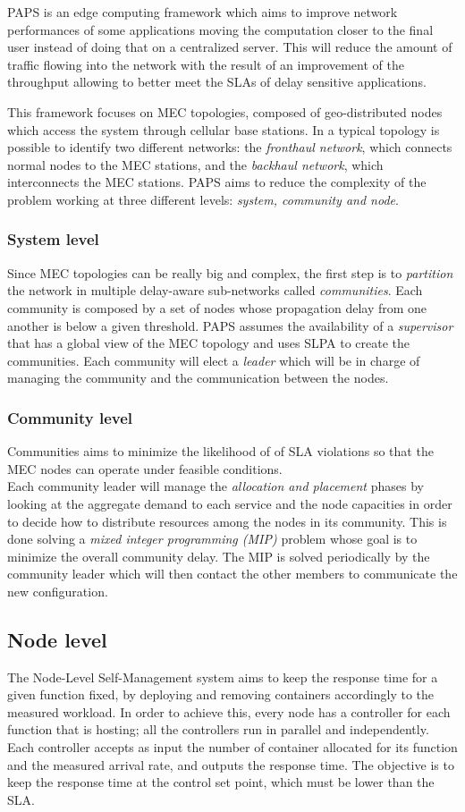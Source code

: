 PAPS is an edge computing framework which aims to improve network performances of some 
applications moving the computation closer to the final user instead of doing that on 
a centralized server. This will reduce the amount of traffic flowing into the network
with the result of an improvement of the throughput allowing to better meet the SLAs
of delay sensitive applications.

This framework focuses on MEC topologies, composed of geo-distributed nodes which access
the system through cellular base stations. In a typical topology is possible to identify
two different networks: the \textit{fronthaul network}, which connects normal nodes to 
the MEC stations, and the \textit{backhaul network}, which interconnects the MEC stations.
PAPS aims to reduce the complexity of the problem working at three different levels: 
\textit{system, community and node}. 
\\
\subsubsection*{System level}
Since MEC topologies can be really big and complex, the first step is to \textit{partition}
the network in multiple delay-aware sub-networks called \textit{communities}. Each community
is composed by a set of nodes whose propagation delay from one another is below a given 
threshold. PAPS assumes the availability of a \textit{supervisor} that has a global view of
the MEC topology and uses SLPA \cite{SLPA} to create the communities. Each community will
elect a \textit{leader} which will be in charge of managing the community and the communication
between the nodes.

\subsubsection*{Community level}
Communities aims to minimize the likelihood of of SLA violations so that the MEC nodes
can operate under feasible conditions.\\
Each community leader will manage the \textit{allocation and placement} phases by looking at 
the aggregate demand to each service and the node capacities in order to decide how to 
distribute resources among the nodes in its community. This is done solving a \textit{mixed
integer programming (MIP)} problem whose goal is to minimize the overall community delay. 
The MIP is solved periodically by the community leader which will then contact the other members
to communicate the new configuration.

\subsection*{Node level}
The Node-Level Self-Management system aims to keep the response time for a given function fixed, 
by deploying and removing containers accordingly to the measured workload.
In order to achieve this, every node has a controller for each function that is hosting; all the controllers
run in parallel and independently.
Each controller accepts as input the number of container allocated for its function and the 
measured arrival rate, and outputs the response time. The objective is to keep the response time
at the control set point, which must be lower than the SLA.
